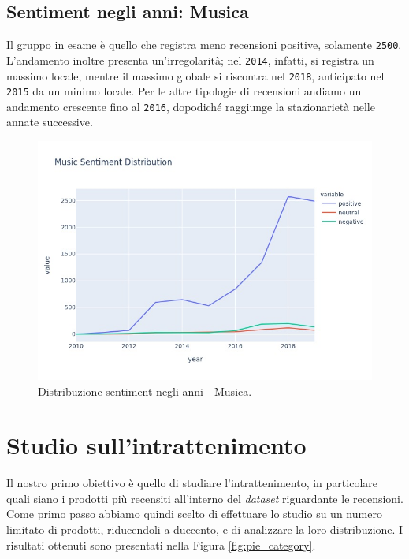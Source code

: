 		
			\subsection{Sentiment negli anni: Musica}
				Il gruppo in esame è quello che registra meno recensioni positive, solamente \verb|2500|. L'andamento inoltre presenta un'irregolarità; nel \verb|2014|, infatti, si registra un massimo locale, mentre il massimo globale si riscontra nel \verb|2018|, anticipato nel \verb|2015| da un minimo locale. Per le altre tipologie di recensioni andiamo un andamento crescente fino al \verb|2016|, dopodiché raggiunge la stazionarietà nelle annate successive.
				
				\begin{figure} [h]
					\includegraphics[width=\textwidth]{Figure/sent_year_music}
					\caption{Distribuzione sentiment negli anni - Musica.}
					\label{fig:sent_year_music}
				\end{figure}
			
		
	\section{Studio sull'intrattenimento}
		Il nostro primo obiettivo è quello di studiare l'intrattenimento, in particolare quali siano i prodotti più recensiti all'interno del \textit{dataset} riguardante le recensioni. Come primo passo abbiamo  quindi scelto di effettuare lo studio su un numero limitato di prodotti, riducendoli a duecento, e di analizzare la loro distribuzione. I risultati ottenuti sono presentati nella Figura \ref{fig:pie_category}. 
			
